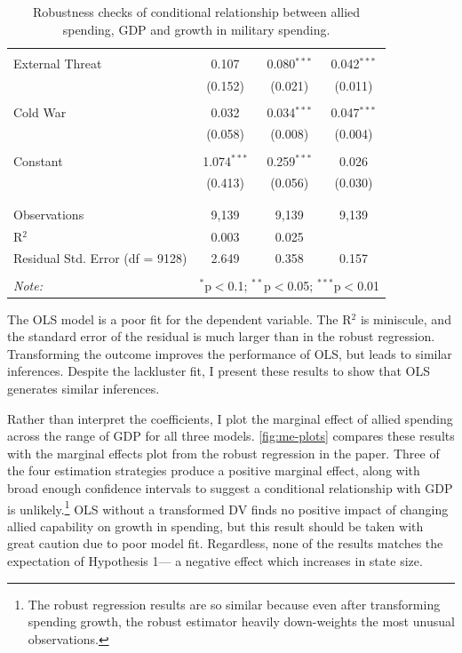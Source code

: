 \documentclass[12pt]{article}
\begin{document}
\begin{table}[!htbp]
\begin{tabular}{@{\extracolsep{5pt}}lccc}
  & & & \\ 
 External Threat & 0.107 & 0.080$^{***}$ & 0.042$^{***}$ \\ 
  & (0.152) & (0.021) & (0.011) \\ 
  & & & \\ 
 Cold War & 0.032 & 0.034$^{***}$ & 0.047$^{***}$ \\ 
  & (0.058) & (0.008) & (0.004) \\ 
  & & & \\ 
 Constant & 1.074$^{***}$ & 0.259$^{***}$ & 0.026 \\ 
  & (0.413) & (0.056) & (0.030) \\ 
  & & & \\ 
\hline \\[-1.8ex] 
Observations & 9,139 & 9,139 & 9,139 \\ 
R$^{2}$ & 0.003 & 0.025 &  \\ 
Residual Std. Error (df = 9128) & 2.649 & 0.358 & 0.157 \\ 
\hline 
\hline \\[-1.8ex] 
\textit{Note:}  & \multicolumn{3}{r}{$^{*}$p$<$0.1; $^{**}$p$<$0.05; $^{***}$p$<$0.01} \\ 
\end{tabular} 
\caption{Robustness checks of conditional relationship between allied spending, GDP and growth in military spending.}
\label{tab:ols-est}
\end{table} 


The OLS model is a poor fit for the dependent variable. 
The R$^2$ is miniscule, and the standard error of the residual is much larger than in the robust regression. 
Transforming the outcome improves the performance of OLS, but leads to similar inferences. 
Despite the lackluster fit, I present these results to show that OLS generates similar inferences. 


Rather than interpret the coefficients, I plot the marginal effect of allied spending across the range of GDP for all three models.
\autoref{fig:me-plots} compares these results with the marginal effects plot from the robust regression in the paper. 
Three of the four estimation strategies produce a positive marginal effect, along with broad enough confidence intervals to suggest a conditional relationship with GDP is unlikely.\footnote{The robust regression results are so similar because even after transforming spending growth, the robust estimator heavily down-weights the most unusual observations.} 
OLS without a transformed DV finds no positive impact of changing allied capability on growth in spending, but this result should be taken with great caution due to poor model fit. 
Regardless, none of the results matches the expectation of Hypothesis 1--- a negative effect which increases in state size. 
\end{document}
